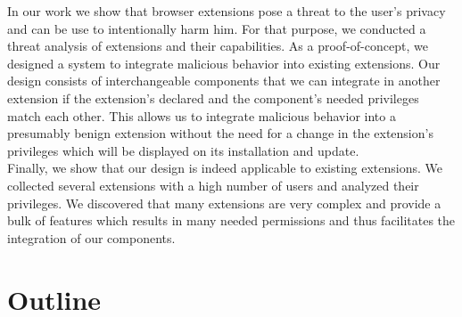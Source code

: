 	In our work we show that browser extensions pose a threat to the user's privacy and can be use to intentionally harm him. For that purpose, we conducted a threat analysis of extensions and their capabilities. As a proof-of-concept, we designed a system to integrate malicious behavior into existing extensions. Our design consists of interchangeable components that we can integrate in another extension if the extension's declared and the component's needed privileges match each other. This allows us to integrate malicious behavior into a presumably benign extension without the need for a change in the extension's privileges which will be displayed on its installation and update. \\
	Finally, we show that our design is indeed applicable to existing extensions. We collected several extensions with a high number of users and analyzed their privileges. We discovered that many extensions are very complex and provide a bulk of features which results in many needed permissions and thus facilitates the integration of our components. 

\section{Outline}

